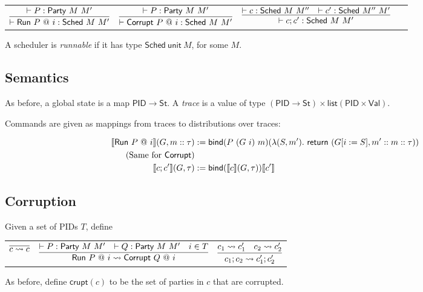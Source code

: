 \documentclass{article}
\newcommand{\Val}{\mathsf{Val}}
\newcommand{\St}{\mathsf{St}}
\newcommand{\PID}{\mathsf{PID}}
\newcommand{\List}{\mathsf{list}}
\begin{document}
    \begin{tabular}{cccc}
        $\infer{\vdash \textsf{Run}\ P\ @\ i : \textsf{Sched}\ M\ M'}{\vdash P : \mathsf{Party}\ M\ M'}$ &
        $\infer{\vdash \textsf{Corrupt}\ P\ @\ i : \textsf{Sched}\ M\ M'}{\vdash P : \mathsf{Party}\ M\ M'}$ &
        $\infer{\vdash c; c' : \textsf{Sched}\ M\ M'}{\vdash c : \textsf{Sched}\ M\ M'' & \vdash c' : \textsf{Sched}\ M''\ M'}$ &
        \ \\
    \end{tabular}

A scheduler is \emph{runnable} if it has type $\textsf{Sched}\ \textsf{unit}\ M$, for some $M$.

\subsection{Semantics}


As before, a global state is a map $\PID \to \St$. A \emph{trace} is a value of type $(\PID \to \St) \times \List (\PID \times \Val)$.

Commands are given as mappings from traces to distributions over traces:

\begin{align*}
    \llbracket \textsf{Run}\ P\ @\ i \rrbracket (G, m :: \tau) &:= \mathsf{bind} (P\ (G\ i)\ m) (\lambda (S, m').\ \mathsf{return}\ (G[i := S], m' :: m :: \tau)) \\
    \text{(Same for \textsf{Corrupt})} \\
    \llbracket c; c' \rrbracket (G, \tau) &:= \mathsf{bind} (\llbracket c \rrbracket (G, \tau)) \llbracket c' \rrbracket
\end{align*}

\subsection{Corruption}

Given a set of PIDs $T$, define

\begin{tabular}{ccc}
    $\infer{c \rightsquigarrow c}{}$ &
    $\infer{\textsf{Run}\ P\ @\ i \rightsquigarrow \textsf{Corrupt}\ Q\ @\ i}{\vdash P : \textsf{Party}\ M\ M' & \vdash Q : \textsf{Party}\ M\ M' & i \in T}$ &
    $\infer{c_1; c_2 \rightsquigarrow c'_1; c'_2}{c_1 \rightsquigarrow c'_1 & c_2 \rightsquigarrow c'_2}$
\end{tabular}


As before, define $\mathsf{crupt}(c)$ to be the set of parties in $c$ that are corrupted.
\end{document}
